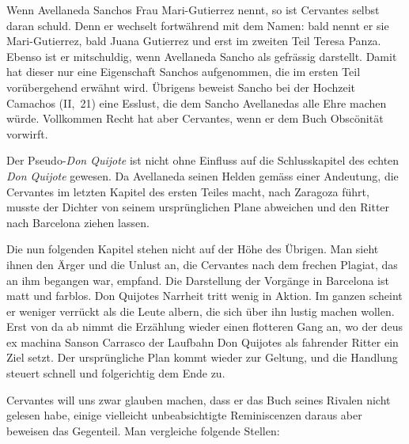 Wenn Avellaneda Sanchos Frau Mari-Gutierrez nennt, so ist
Cervantes selbst daran schuld. Denn er wechselt fortwährend mit dem
Namen: bald nennt er sie Mari-Gutierrez, bald Juana Gutierrez und
erst im zweiten Teil Teresa Panza. Ebenso ist er mitschuldig, wenn
Avellaneda Sancho als gefrässig darstellt. Damit hat dieser nur eine
Eigenschaft Sanchos aufgenommen, die im ersten Teil vorübergehend
erwähnt wird. Übrigens beweist Sancho bei der Hochzeit Camachos (II,~21)
eine Esslust, die dem Sancho Avellanedas alle Ehre machen würde. Vollkommen
Recht hat aber Cervantes, wenn er dem Buch Obscönität vorwirft.

Der Pseudo-{\it Don Quijote} ist nicht ohne Einfluss auf die Schlusskapitel
des echten {\it Don Quijote} gewesen. Da Avellaneda seinen Helden
gemäss einer Andeutung, die Cervantes im letzten Kapitel des ersten
Teiles macht, nach Zaragoza führt, musste der Dichter von seinem
ursprünglichen Plane abweichen und den Ritter nach Barcelona ziehen lassen.

Die nun folgenden Kapitel stehen nicht auf der Höhe des Übrigen.
Man sieht ihnen den Ärger und die Unlust an, die Cervantes nach dem
frechen Plagiat, das an ihm begangen war, empfand. Die Darstellung
der Vorgänge in Barcelona ist matt und farblos. Don Quijotes Narrheit
tritt wenig in Aktion. Im ganzen scheint er weniger verrückt als die
Leute albern, die sich über ihn lustig machen wollen. Erst von da ab
nimmt die Erzählung wieder einen flotteren Gang an, wo der deus ex
machina Sanson Carrasco der Laufbahn Don Quijotes als fahrender
Ritter ein Ziel setzt. Der ursprüngliche Plan kommt wieder zur Geltung,
und die Handlung steuert schnell und folgerichtig dem Ende zu.

Cervantes will uns zwar glauben machen, dass er das Buch seines
Rivalen nicht gelesen habe, einige vielleicht unbeabsichtigte Reminiscenzen
daraus aber beweisen das Gegenteil. Man vergleiche folgende Stellen:


